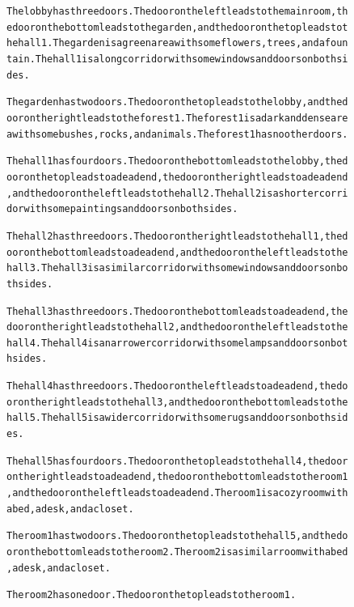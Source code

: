 \begin{figure}[h!]
\begin{AIbox}{\DV}
{\begin{alltt}
The lobby has three doors. The door on the left leads to the main room, the door on the bottom leads to the garden, and the door on the top leads to the hall 1. The garden is a green area with some flowers, trees, and a fountain. The hall 1 is a long corridor with some windows and doors on both sides.

The garden has two doors. The door on the top leads to the lobby, and the door on the right leads to the forest 1. The forest 1 is a dark and dense area with some bushes, rocks, and animals. The forest 1 has no other doors.

The hall 1 has four doors. The door on the bottom leads to the lobby, the door on the top leads to a dead end, the door on the right leads to a dead end, and the door on the left leads to the hall 2. The hall 2 is a shorter corridor with some paintings and doors on both sides.

The hall 2 has three doors. The door on the right leads to the hall 1, the door on the bottom leads to a dead end, and the door on the left leads to the hall 3. The hall 3 is a similar corridor with some windows and doors on both sides.

The hall 3 has three doors. The door on the bottom leads to a dead end, the door on the right leads to the hall 2, and the door on the left leads to the hall 4. The hall 4 is a narrower corridor with some lamps and doors on both sides.

The hall 4 has three doors. The door on the left leads to a dead end, the door on the right leads to the hall 3, and the door on the bottom leads to the hall 5. The hall 5 is a wider corridor with some rugs and doors on both sides.

The hall 5 has four doors. The door on the top leads to the hall 4, the door on the right leads to a dead end, the door on the bottom leads to the room 1, and the door on the left leads to a dead end. The room 1 is a cozy room with a bed, a desk, and a closet.

The room 1 has two doors. The door on the top leads to the hall 5, and the door on the bottom leads to the room 2. The room 2 is a similar room with a bed, a desk, and a closet.

The room 2 has one door. The door on the top leads to the room 1.


\end{alltt}}
\end{AIbox}
\end{figure}
